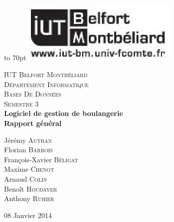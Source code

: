 \documentclass[12pt]{report}
\begin{document}
{
\begin{titlepage}

\vbox to 70pt{\hfill\includegraphics[height=3cm]{images/logo-iut.eps}}\
\begin{center}

\textsc{\LARGE IUT Belfort Montbéliard}\\[0.7cm]
\textsc{\LARGE Département Informatique}\\[1.0cm]
\textsc{\Large Bases De Données}\\[0.5cm]
\textsc{\Large Semestre 3}\\[5cm]


{ \huge \bfseries Logiciel de gestion de boulangerie}\\[0.5cm]
{ \huge \bfseries Rapport général}\\[3cm]

\begin{large}
Jérémy \textsc{Autran}\\[0.3em]
Florian \textsc{Barrois}\\[0.3em]
François-Xavier \textsc{Béligat}\\[0.3em]
Maxime \textsc{Chenot}\\[0.3em]
Arnaud \textsc{Colin}\\[0.3em]
Benoît \textsc{Houdayer}\\[0.3em]
Anthony \textsc{Ruhier}\\[0.3em]

\end{large}

\vfill

{\large 08 Janvier 2014}

\end{center}
\end{titlepage}
}

{\clearpage\mbox{}\thispagestyle{empty}\clearpage}
\setcounter{page}{1}
%
{\large{}}












\tableofcontents
{}

%
%
\end{document}

